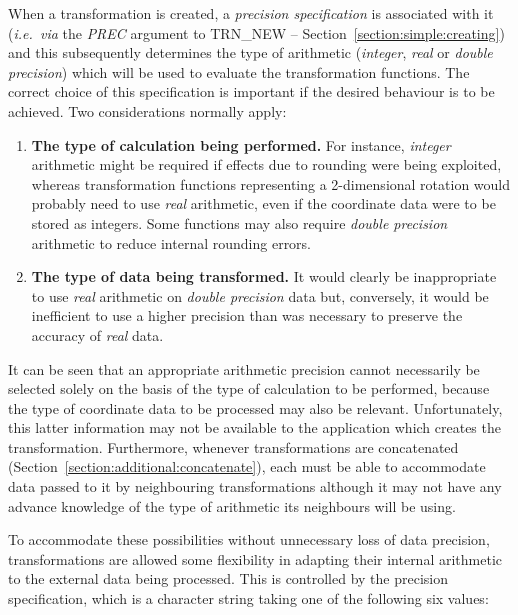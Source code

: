 \documentclass[twoside,nolof,11pt]{starlink}
\providecommand{\name}[1]{\small{#1}}
\providecommand{\fortvar}[1]{\emph{#1}}
\begin{document}
When a transformation is created, a \emph{precision specification} is
associated with it (\emph{i.e.\ via} the \fortvar{PREC} argument to
\name{TRN\_NEW} -- Section~\ref{section:simple:creating}) and this
subsequently determines the type of arithmetic (\emph{integer}, \emph{real} or
\emph{double precision}) which will be used to evaluate the transformation
functions.
The correct choice of this specification is important if the desired
behaviour is to be achieved.
Two considerations normally apply:

\begin{enumerate}

\item \textbf{The type of calculation being performed.}
For instance, \emph{integer} arithmetic might be required if effects due to
rounding were being exploited, whereas transformation functions representing
a 2-dimensional rotation would probably need to use \emph{real} arithmetic,
even if the coordinate data were to be stored as integers.
Some functions may also require \emph{double precision} arithmetic to reduce
internal rounding errors.

\item \textbf{The type of data being transformed.}
It would clearly be inappropriate to use \emph{real} arithmetic on \emph{double precision} data but, conversely, it would be inefficient to use a
higher precision than was necessary to preserve the accuracy of \emph{real}
data.

\end{enumerate}

It can be seen that an appropriate arithmetic precision cannot necessarily
be selected solely on the basis of the type of calculation to be performed,
because the type of coordinate data to be processed may also be relevant.
Unfortunately, this latter information may not be available to the
application which creates the transformation.
Furthermore, whenever transformations are concatenated
(Section~\ref{section:additional:concatenate}), each must be able to
accommodate data passed to it by neighbouring transformations although it
may not have any advance knowledge of the type of arithmetic its neighbours
will be using.

To accommodate these possibilities without unnecessary loss of data
precision, transformations are allowed some flexibility in adapting their
internal arithmetic to the external data being processed.
This is controlled by the precision specification, which is a character
string taking one of the following six values:
\end{document}
